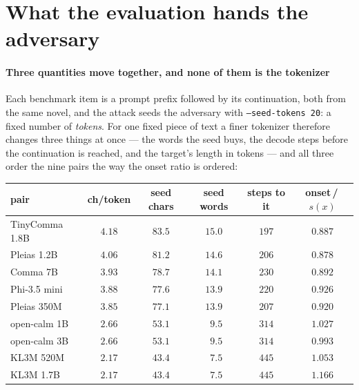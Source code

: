 \section{What the evaluation hands the adversary}\label{app:seed}

\paragraph{Three quantities move together, and none of them is the tokenizer}
Each benchmark item is a prompt prefix followed by its continuation, both from the same novel, and
the attack seeds the adversary with \texttt{--seed-tokens 20}: a fixed number of \emph{tokens}. For one
fixed piece of text a finer tokenizer therefore changes three things at once --- the words the seed
buys, the decode steps before the continuation is reached, and the target's length in tokens --- and
all three order the nine pairs the way the onset ratio is ordered:

\begin{center}\footnotesize
\setlength{\tabcolsep}{4pt}
\begin{tabular}{@{}lccccc@{}}
\toprule
pair & ch/token & seed chars & seed words & steps to it & onset\,/\,$s(x)$ \\
\midrule
TinyComma 1.8B  & $4.18$ & $83.5$ & $15.0$ & $197$ & $0.887$ \\
Pleias 1.2B     & $4.06$ & $81.2$ & $14.6$ & $206$ & $0.878$ \\
Comma 7B        & $3.93$ & $78.7$ & $14.1$ & $230$ & $0.892$ \\
Phi-3.5 mini    & $3.88$ & $77.6$ & $13.9$ & $220$ & $0.926$ \\
Pleias 350M     & $3.85$ & $77.1$ & $13.9$ & $207$ & $0.920$ \\
open-calm 1B    & $2.66$ & $53.1$ & $\phantom{0}9.5$ & $314$ & $1.027$ \\
open-calm 3B    & $2.66$ & $53.1$ & $\phantom{0}9.5$ & $314$ & $0.993$ \\
KL3M 520M       & $2.17$ & $43.4$ & $\phantom{0}7.5$ & $445$ & $1.053$ \\
KL3M 1.7B       & $2.17$ & $43.4$ & $\phantom{0}7.5$ & $445$ & $1.166$ \\
\bottomrule
\end{tabular}
\end{center}

